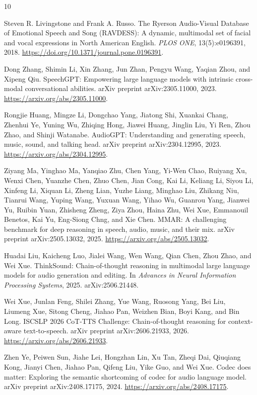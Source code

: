 \documentclass{article}
\begin{document}
\begin{thebibliography}{10}

Steven R. Livingstone and Frank A. Russo.
\newblock The Ryerson Audio-Visual Database of Emotional Speech and Song (RAVDESS): A dynamic, multimodal set of facial and vocal expressions in North American English.
\newblock \emph{PLOS ONE}, 13(5):e0196391, 2018.
\newblock \url{https://doi.org/10.1371/journal.pone.0196391}.

Dong Zhang, Shimin Li, Xin Zhang, Jun Zhan, Pengyu Wang, Yaqian Zhou, and Xipeng Qiu.
\newblock SpeechGPT: Empowering large language models with intrinsic cross-modal conversational abilities.
\newblock arXiv preprint arXiv:2305.11000, 2023.
\newblock \url{https://arxiv.org/abs/2305.11000}.

Rongjie Huang, Mingze Li, Dongchao Yang, Jiatong Shi, Xuankai Chang, Zhenhui Ye, Yuning Wu, Zhiqing Hong, Jiawei Huang, Jinglin Liu, Yi Ren, Zhou Zhao, and Shinji Watanabe.
\newblock AudioGPT: Understanding and generating speech, music, sound, and talking head.
\newblock arXiv preprint arXiv:2304.12995, 2023.
\newblock \url{https://arxiv.org/abs/2304.12995}.

Ziyang Ma, Yinghao Ma, Yanqiao Zhu, Chen Yang, Yi-Wen Chao, Ruiyang Xu, Wenxi Chen, Yuanzhe Chen, Zhuo Chen, Jian Cong, Kai Li, Keliang Li, Siyou Li, Xinfeng Li, Xiquan Li, Zheng Lian, Yuzhe Liang, Minghao Liu, Zhikang Niu, Tianrui Wang, Yuping Wang, Yuxuan Wang, Yihao Wu, Guanrou Yang, Jianwei Yu, Ruibin Yuan, Zhisheng Zheng, Ziya Zhou, Haina Zhu, Wei Xue, Emmanouil Benetos, Kai Yu, Eng-Siong Chng, and Xie Chen.
\newblock MMAR: A challenging benchmark for deep reasoning in speech, audio, music, and their mix.
\newblock arXiv preprint arXiv:2505.13032, 2025.
\newblock \url{https://arxiv.org/abs/2505.13032}.

Huadai Liu, Kaicheng Luo, Jialei Wang, Wen Wang, Qian Chen, Zhou Zhao, and Wei Xue.
\newblock ThinkSound: Chain-of-thought reasoning in multimodal large language models for audio generation and editing.
\newblock In \emph{Advances in Neural Information Processing Systems}, 2025.
\newblock arXiv:2506.21448.

Wei Xue, Junlan Feng, Shilei Zhang, Yue Wang, Ruosong Yang, Bei Liu, Liumeng Xue, Sitong Cheng, Jiahao Pan, Weizhen Bian, Boyi Kang, and Bin Long.
\newblock ISCSLP 2026 CoT-TTS Challenge: Chain-of-thought reasoning for context-aware text-to-speech.
\newblock arXiv preprint arXiv:2606.21933, 2026.
\newblock \url{https://arxiv.org/abs/2606.21933}.

Zhen Ye, Peiwen Sun, Jiahe Lei, Hongzhan Lin, Xu Tan, Zheqi Dai, Qiuqiang Kong, Jianyi Chen, Jiahao Pan, Qifeng Liu, Yike Guo, and Wei Xue.
\newblock Codec does matter: Exploring the semantic shortcoming of codec for audio language model.
\newblock arXiv preprint arXiv:2408.17175, 2024.
\newblock \url{https://arxiv.org/abs/2408.17175}.

\end{thebibliography}
\end{document}
